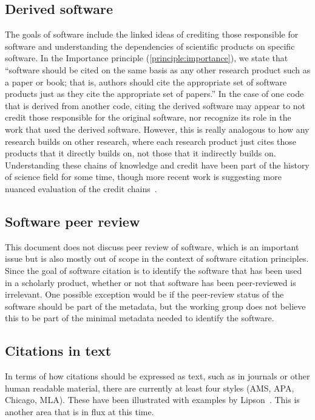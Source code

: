 \documentclass[11pt, oneside]{amsart}
\begin{document}
\subsection{Derived software}

The goals of software include the linked ideas of crediting those responsible for software and understanding the dependencies of scientific products on specific software.
In the Importance principle (\ref{principle:importance}), we state that
``software should be cited on the same basis as any other research product such as a paper or book; that is, authors should cite the appropriate set of software products just as they cite the appropriate set of papers.''
In the case of one code that is derived from another code, citing the derived software may appear to not credit those responsible for the original software, nor recognize its role in the work that used the derived software.
However, this is really analogous to how any research builds on other research, where each research product just cites those products that it directly builds on, not those that it indirectly builds on.
Understanding these chains of knowledge and credit have been part of the history of science field for some time, though more recent work is suggesting more nuanced evaluation of the credit chains~\cite{casrai-credit, transitive_credit_json-ld}.

\subsection{Software peer review}

This document does not discuss peer review of software, which is an important issue but is
also mostly out of scope in the context of software citation principles.
Since the goal of software citation is to identify the software
that has been used in a scholarly product, whether or not that software has been peer-reviewed
is irrelevant.  One possible exception would be if the peer-review status of the software should
be part of the metadata, but the working group does not believe this to be part of the
minimal metadata needed to identify the software.

\subsection{Citations in text}

In terms of how citations should be expressed as text, such
as in journals or other human readable material, there are currently at least four styles (AMS, APA, Chicago, MLA). These have been illustrated with examples by Lipson~\cite{lipson2011cite}.
This is another area that is in flux at this time.
\end{document}
